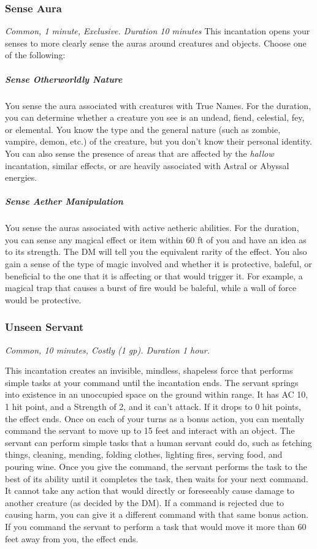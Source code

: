 \subsubsection{Sense Aura} \label{inc:sense-aura}
\textit{Common, 1 minute, Exclusive. Duration 10 minutes}
This incantation opens your senses to more clearly sense the auras around creatures and objects. Choose one of the following:

\subparagraph*{Sense Otherworldly Nature} You sense the aura associated with creatures with True Names. For the duration, you can determine whether a creature you see is an undead, fiend, celestial, fey, or elemental. You know the type and the general nature (such as zombie, vampire, demon, etc.) of the creature, but you don't know their personal identity. You can also sense the presence of areas that are affected by the \textit{hallow} incantation, similar effects, or are heavily associated with Astral or Abyssal energies.

\subparagraph*{Sense Aether Manipulation} You sense the auras associated with active aetheric abilities. For the duration, you can sense any magical effect or item within 60 ft of you and have an idea as to its strength. The DM will tell you the equivalent rarity of the effect. You also gain a sense of the type of magic involved and whether it is protective, baleful, or beneficial to the one that it is affecting or that would trigger it. For example, a magical trap that causes a burst of fire would be baleful, while a wall of force would be protective.

\subsubsection{Unseen Servant}
\textit{Common, 10 minutes, Costly (1 gp). Duration 1 hour.}

This incantation creates an invisible, mindless, shapeless force that performs simple tasks at your command until the incantation ends. The servant springs into existence in an unoccupied space on the ground within range. It has AC 10, 1 hit point, and a Strength of 2, and it can't attack. If it drops to 0 hit points, the effect ends.
Once on each of your turns as a bonus action, you can mentally command the servant to move up to 15 feet and interact with an object. The servant can perform simple tasks that a human servant could do, such as fetching things, cleaning, mending, folding clothes, lighting fires, serving food, and pouring wine. Once you give the command, the servant performs the task to the best of its ability until it completes the task, then waits for your next command. It cannot take any action that would directly or foreseeably cause damage to another creature (as decided by the DM). If a command is rejected due to causing harm, you can give it a different command with that same bonus action.
If you command the servant to perform a task that would move it more than 60 feet away from you, the effect ends.


